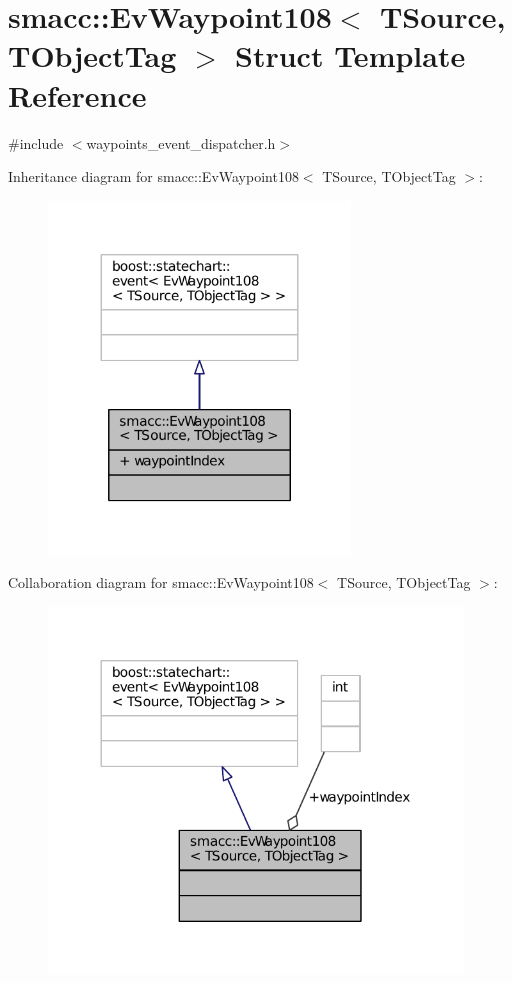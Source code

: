 \hypertarget{structsmacc_1_1EvWaypoint108}{}\section{smacc\+:\+:Ev\+Waypoint108$<$ T\+Source, T\+Object\+Tag $>$ Struct Template Reference}
\label{structsmacc_1_1EvWaypoint108}


{\ttfamily \#include $<$waypoints\+\_\+event\+\_\+dispatcher.\+h$>$}



Inheritance diagram for smacc\+:\+:Ev\+Waypoint108$<$ T\+Source, T\+Object\+Tag $>$\+:
\nopagebreak
\begin{figure}[H]
\begin{center}
\leavevmode
\includegraphics[width=227pt]{structsmacc_1_1EvWaypoint108__inherit__graph}
\end{center}
\end{figure}


Collaboration diagram for smacc\+:\+:Ev\+Waypoint108$<$ T\+Source, T\+Object\+Tag $>$\+:
\nopagebreak
\begin{figure}[H]
\begin{center}
\leavevmode
\includegraphics[width=312pt]{structsmacc_1_1EvWaypoint108__coll__graph}
\end{center}
\end{figure}
